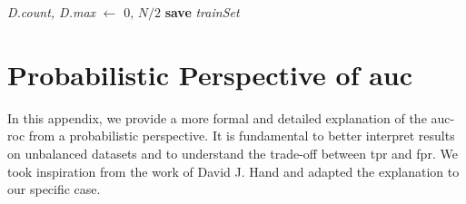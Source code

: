 \begin{appendices}
\begin{algorithm}
        \textit{D.count, D.max} $\gets$ $0, \,N/2$\;
        \textbf{save} \textit{trainSet}\;
    \end{algorithm}

\chapter{Probabilistic Perspective of \ac{auc}}
In this appendix, we provide a more formal and detailed explanation of the \ac{auc}-\ac{roc}
from a probabilistic perspective. It is fundamental to better interpret results on 
unbalanced datasets and to understand the trade-off between \ac{tpr} and \ac{fpr}.
We took inspiration from the work of David J. Hand \cite{roc_auc_probabilistic} 
and adapted the explanation to our specific case.


\end{appendices}
